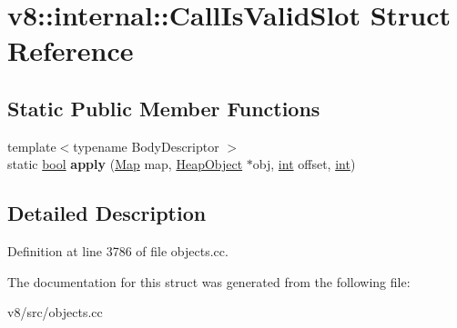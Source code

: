 \hypertarget{structv8_1_1internal_1_1CallIsValidSlot}{}\section{v8\+:\+:internal\+:\+:Call\+Is\+Valid\+Slot Struct Reference}
\label{structv8_1_1internal_1_1CallIsValidSlot}
\subsection*{Static Public Member Functions}
\begin{DoxyCompactItemize}
\item 
\mbox{\label{structv8_1_1internal_1_1CallIsValidSlot_a6ea7d32a03d7d36897dd9083e48a1fc3}} 
{\footnotesize template$<$typename Body\+Descriptor $>$ }\\static \mbox{\hyperlink{classbool}{bool}} {\bfseries apply} (\mbox{\hyperlink{classv8_1_1internal_1_1Map}{Map}} map, \mbox{\hyperlink{classv8_1_1internal_1_1HeapObject}{Heap\+Object}} $\ast$obj, \mbox{\hyperlink{classint}{int}} offset, \mbox{\hyperlink{classint}{int}})
\end{DoxyCompactItemize}


\subsection{Detailed Description}


Definition at line 3786 of file objects.\+cc.



The documentation for this struct was generated from the following file\+:\begin{DoxyCompactItemize}
\item 
v8/src/objects.\+cc\end{DoxyCompactItemize}
